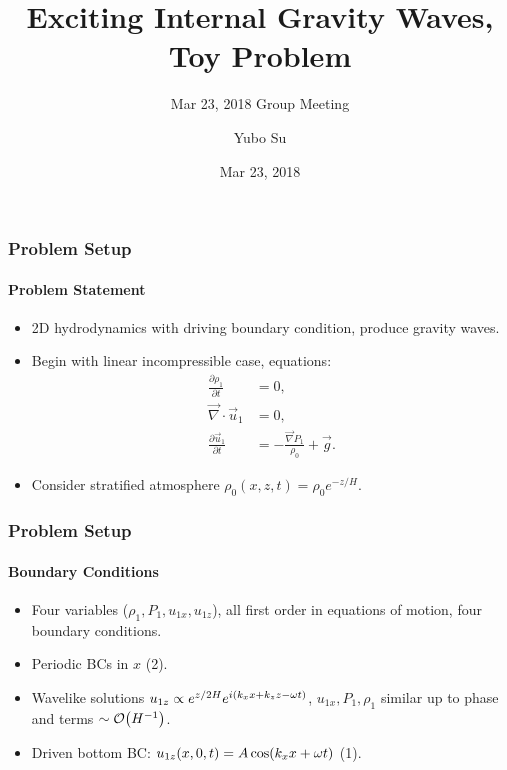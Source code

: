 \documentclass[dvipsnames]{beamer}
\newcommand*{\pd}[2]{\frac{\partial#1}{\partial#2}}
\DeclarePairedDelimiter\p{\lparen}{\rparen}
\begin{document}
\pagestyle{fancy}
\cfoot{\thepage/\pageref{LastPage}}

\title[Exciting Internal Gravity Waves]{Exciting Internal Gravity Waves, Toy
Problem}
\subtitle[]{Mar 23, 2018 Group Meeting}
\author[Yubo Su]{Yubo Su}
\date{Mar 23, 2018}

\frame{\titlepage}

\begin{frame}
    \frametitle{Problem Setup}
    \framesubtitle{Problem Statement}
    \begin{itemize}
        \item 2D hydrodynamics with driving boundary condition, produce gravity
            waves.
        \item Begin with linear incompressible case, equations:
        \begin{subequations}\label{se:eom}
            \begin{align}
                \pd{\rho_1}{t} &= 0,\\
                \vec{\nabla} \cdot \vec{u}_1 &= 0,\\
                \pd{\vec{u}_1}{t} &= -\frac{\vec{\nabla}P_1}{\rho_0} + \vec{g}.
            \end{align}
        \end{subequations}

        \item Consider stratified atmosphere $\rho_0(x, z, t) = \rho_0
            e^{-z/H}$.
    \end{itemize}
\end{frame}

\begin{frame}
    \frametitle{Problem Setup}
    \framesubtitle{Boundary Conditions}

    \begin{itemize}
        \item Four variables ($\rho_1, P_1, u_{1x}, u_{1z}$), all first order in
            equations of motion, four boundary conditions.

        \item Periodic BCs in $x$ (2).

        \item Wavelike solutions $u_{1z} \propto e^{z/2H}e^{i\p*{k_xx + k_zz -
            \omega t}}$, $u_{1x}, P_1, \rho_1$ similar up to phase and terms
            $\sim \mathcal{O}\p*{H^{-1}}$.

        \item Driven bottom BC\@: $u_{1z}(x, 0, t) = A\cos \p*{k_xx + \omega t}$
            (1).
    \end{itemize}
\end{frame}
\end{document}
